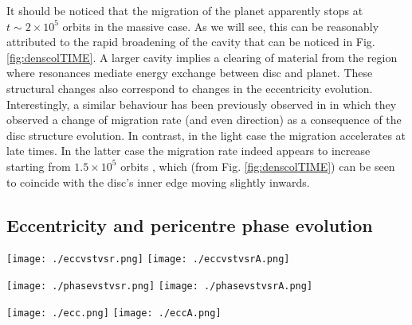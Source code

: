 \documentclass[usenatbib,a4paper,times,fleqn]{mnras}
\begin{document}
It should be noticed that the migration of the planet apparently stops at $t\sim 2\times 10^5$ orbits in the massive case. As we will see, this can be reasonably attributed to the rapid broadening of the cavity that can be noticed in Fig. \ref{fig:denscolTIME}. A larger cavity implies a clearing of material from the region where resonances mediate energy exchange between disc and planet. These structural changes also correspond to changes in the eccentricity evolution.
Interestingly, a similar behaviour has been previously observed in \citet{papaloizou2001} in which they observed a change of migration rate (and even direction) as a consequence of the disc structure evolution. In contrast, in the light case the migration accelerates at late times.
In the latter case the migration rate indeed appears to increase starting from $1.5 \times 10^5$ orbits , which (from Fig. \ref{fig:denscolTIME}) can be seen to coincide with the disc's inner edge moving slightly inwards.


\subsection{Eccentricity and pericentre phase evolution}\label{sec:eccevo}

\begin{figure*}
\begin{center}
\texttt{[image: ./eccvstvsr.png]}
\texttt{[image: ./eccvstvsrA.png]}
\caption{Colour plots of the eccentricity (azimuthal average) as a function of time (y-axis) and radius (x-axis) for light (left panel) and massive (right panel) case.}
\label{fig:ecccol}
\end{center}
\end{figure*}

\begin{figure*}
\begin{center}
\texttt{[image: ./phasevstvsr.png]}
\texttt{[image: ./phasevstvsrA.png]}
\caption{Pericentre phase colour-plot as a function of time (y-axis) and radius (x-axis) for light (left panel) and massive (right panel. ) case. }
\label{fig:phasecol}
\end{center}
\end{figure*}

\begin{figure*}
\begin{center}
\texttt{[image: ./ecc.png]}
\texttt{[image: ./eccA.png]}
\caption{Eccentricity $e$ as a function of time for light (left panel) and massive (right panel) case. The blue curve shows the planet eccentricity, the green curve the disc eccentricity at $R=4.7$ in the light case and at $R=5$ (azimuthal averages) in the massive one, while the red curve is a global measurement of the disc eccentricity starting from the AMD (see Sec. \ref{sec:eccevo}). The choice to use two different reference radii for the disc eccentricity is due to the slightly different size of the cavity in the two cases.}
\label{fig:ecc}
\end{center}
\end{figure*}
\end{document}
